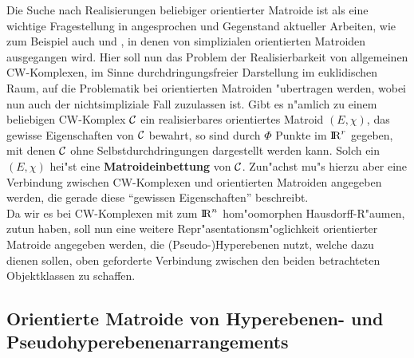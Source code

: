 Die Suche nach Realisierungen beliebiger orientierter Matroide ist als eine
wichtige Fragestellung in \cite{Bj:93} angesprochen und Gegenstand aktueller
Arbeiten, wie zum Beispiel auch \cite{Schu:92} und \cite{Dau:89}, in denen von
simplizialen orientierten Matroiden ausgegangen wird. Hier soll nun das Problem
der Realisierbarkeit von allgemeinen CW-Komplexen, im Sinne durchdringungsfreier
Darstellung im euklidischen Raum, auf die Problematik bei orientierten Matroiden
"ubertragen werden, wobei nun auch der nichtsimpliziale Fall zuzulassen ist.
Gibt es n"amlich zu einem beliebigen CW-Komplex $\cal C$ ein realisierbares
orientiertes Matroid $(E,\chi)$, das gewisse Eigenschaften von $\cal C$
bewahrt, so sind durch $\Phi$ Punkte im $\mbox{$\rm I\!R$}^r$ gegeben, mit denen $\cal C$ ohne
Selbstdurchdringungen dargestellt werden kann. Solch ein $(E,\chi)$ hei"st eine
{\bf Matroideinbettung} von $\cal C$. Zun"achst mu"s
hierzu aber eine Verbindung zwischen CW-Komplexen und orientierten Matroiden
angegeben werden, die gerade diese "`gewissen Eigenschaften"' beschreibt.\\
Da wir es bei CW-Komplexen mit zum $\mbox{$\rm I\!R$}^n$ hom"oomorphen Hausdorff-R"aumen,
zutun haben, soll nun eine weitere Repr"asentationsm"oglichkeit orientierter
Matroide angegeben werden, die (Pseudo-)Hyperebenen nutzt, welche dazu dienen
sollen, oben geforderte Verbindung zwischen den beiden betrachteten
Objektklassen zu schaffen.

\subsection{Orientierte Matroide von Hy\-per\-ebe\-nen- und
            Pseu\-do\-hy\-per\-ebe\-nen\-arrange\-ments}

